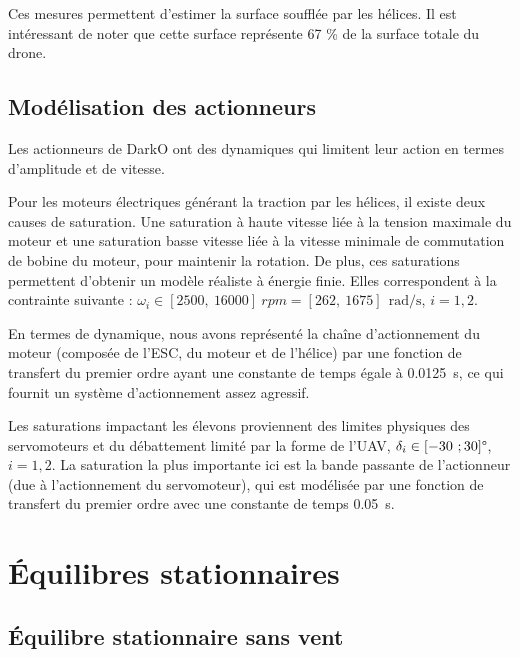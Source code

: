     Ces mesures permettent d'estimer la surface soufflée par les hélices. Il est intéressant de noter que cette surface représente 67 \% de la surface totale du drone.
    

\subsection{Modélisation des actionneurs}
    \label{sec:saturation}
    Les actionneurs de DarkO ont des dynamiques qui limitent leur action en termes d'amplitude et de vitesse.

    Pour les moteurs électriques générant la traction par les hélices, il existe deux causes de saturation. Une saturation à haute vitesse liée à  la tension maximale du moteur et une saturation basse vitesse liée à la vitesse minimale de commutation de bobine du moteur, pour maintenir la rotation. De plus, ces saturations permettent d'obtenir un modèle réaliste à énergie finie. Elles correspondent à la contrainte suivante : $\omega_i \in [2500,~16000]~rpm = [262,~1675]~\SI{}{\radian\per\second}$, $i=1,2$.
    
    En termes de dynamique, nous avons représenté la chaîne d'actionnement du moteur (composée de l'ESC, du moteur et de l'hélice) par une fonction de transfert du premier ordre ayant une constante de temps égale à \SI{0,0125}{\second}, ce qui fournit un système d'actionnement assez agressif.

    Les saturations impactant les élevons proviennent des limites physiques des servomoteurs et du débattement limité par la forme de l'UAV, $\delta_i \in [-30~; 30]\text{\textdegree}$, $i=1,2$. La saturation la plus importante ici est la bande passante de l'actionneur (due à l'actionnement du servomoteur), qui est modélisée par une fonction de transfert du premier ordre avec une constante de temps \SI{0,05}{\second}. 

\section{Équilibres stationnaires}
    \subsection{Équilibre stationnaire sans vent}
        \label{sec:eq_nowind}

